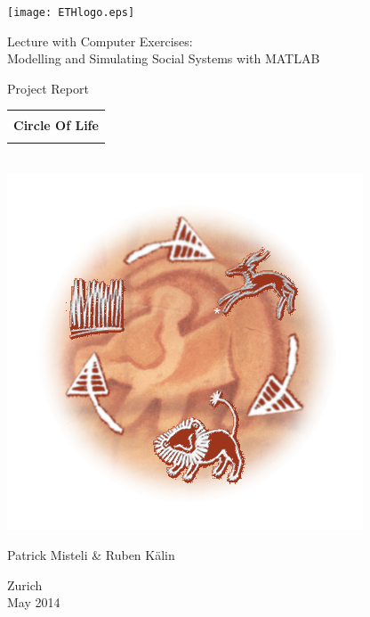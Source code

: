 
\thispagestyle{empty}

\begin{center}
\texttt{[image: ETHlogo.eps]}

\bigskip


\bigskip


\bigskip


\LARGE{ 	Lecture with Computer Exercises:\\ }
\LARGE{ Modelling and Simulating Social Systems with MATLAB\\}

\bigskip

\bigskip

\small{Project Report}\\

\bigskip

\bigskip

\bigskip

\bigskip


\begin{tabular}{|c|}
\hline
\\
\textbf{\LARGE{Circle Of Life}}\\
\\
\hline
\end{tabular}
\bigskip
\\
\includegraphics[scale=0.69]{images/circleEdited.png}


\LARGE{Patrick Misteli \& Ruben K{\"a}lin}



\bigskip

\bigskip

\bigskip

\bigskip

\bigskip

\bigskip

\bigskip

Zurich\\
May 2014\\

\end{center}


